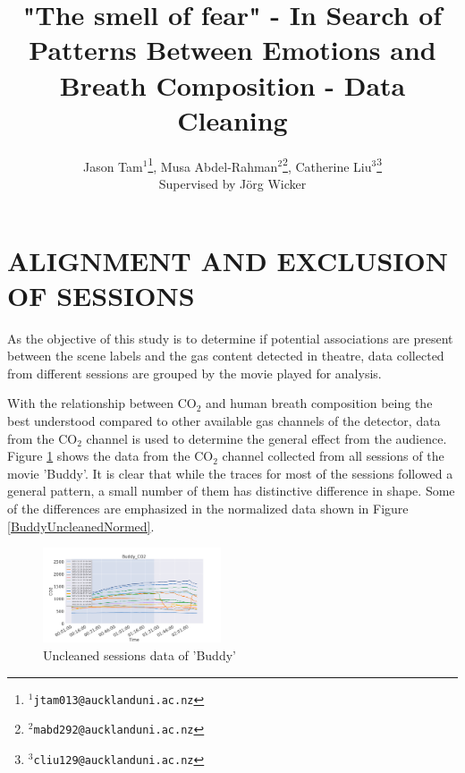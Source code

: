 \documentclass[letterpaper, 10 pt, conference]{ieeeconf}  %
\title{\LARGE \bf
"The smell of fear" - In Search of Patterns Between Emotions and Breath Composition - Data Cleaning
}
\author{Jason Tam$^{1}$\thanks{{\tt\small $^{1}$jtam013@aucklanduni.ac.nz}}, Musa Abdel-Rahman$^{2}$\thanks{{\tt\small $^{2}$mabd292@aucklanduni.ac.nz}}, Catherine Liu$^{3}$\thanks{{\tt\small $^{3}$cliu129@aucklanduni.ac.nz}}\\Supervised by J{\"o}rg Wicker}
\begin{document}
\maketitle
\thispagestyle{empty}
\pagestyle{empty}






\section{ALIGNMENT AND EXCLUSION OF SESSIONS}

As the objective of this study is to determine if potential associations are present between the scene labels and the gas content detected in theatre, data collected from different sessions are grouped by the movie played for analysis.

With the relationship between CO$_2$ and human breath composition being the best understood compared to other available gas channels of the detector, data from the CO$_2$ channel is used to determine the general effect from the audience. Figure \ref{BuddyUncleaned} shows the data from the CO$_2$ channel collected from all sessions of the movie 'Buddy'. It is clear that while the traces for most of the sessions followed a general pattern, a small number of them has distinctive difference in shape. Some of the differences are emphasized in the normalized data shown in Figure \ref{BuddyUncleanedNormed}.

\begin{figure}[thpb]
  \centering
  \includegraphics[width=0.47\textwidth]{../Plots/uncleanedCO2/Buddy_CO2.png}
  \caption{Uncleaned sessions data of 'Buddy'}
  \label{BuddyUncleaned}
\end{figure}
\end{document}
